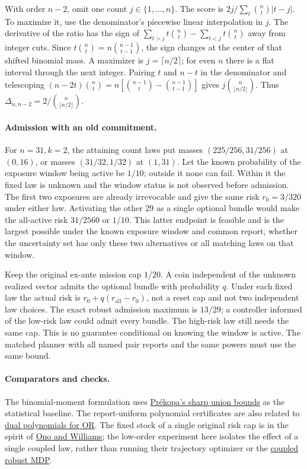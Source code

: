 \documentclass{article}
\begin{document}
With order \(n-2\), omit one count \(j\in\{1,\ldots,n\}\).
The score is \(2j/\sum_t\binom nt|t-j|\). To maximize it,
use the denominator's piecewise linear interpolation in \(j\).
The derivative of the ratio has the sign of
\(\sum_{t>j}t\binom nt-\sum_{t<j}t\binom nt\) away from
integer cuts. Since \(t\binom nt=n\binom{n-1}{t-1}\),
the sign changes at the center of that shifted binomial
mass. A maximizer is \(j=\lceil n/2\rceil\); for even \(n\)
there is a flat interval through the next integer. Pairing
\(t\) and \(n-t\) in the denominator and telescoping
\((n-2t)\binom nt=n[\binom{n-1}t-\binom{n-1}{t-1}]\)
gives \(j\binom n{\lfloor n/2\rfloor}\).
Thus \(\Delta_{n,n-2}=2/\binom n{\lfloor n/2\rfloor}\).

\paragraph{Admission with an old commitment.}
For \(n=31,k=2\), the attaining count laws put masses
\((225/256,31/256)\) at \((0,16)\), or masses
\((31/32,1/32)\) at \((1,31)\). Let the known probability of
the exposure window being active be \(1/10\); outside it none
can fail. Within it the fixed law is unknown and the window
status is not observed before admission. The first two
exposures are already irrevocable and give the same risk
\(r_0=3/320\) under either law. Activating the other 29 as a
single optional bundle would make the all-active risk
\(31/2560\) or \(1/10\). This latter endpoint is feasible
and is the largest possible under the known exposure window
and common report, whether the uncertainty set has only
these two alternatives or all matching laws on that window.

Keep the original ex-ante mission cap \(1/20\). A coin
independent of the unknown realized vector admits the optional
bundle with probability \(q\). Under each fixed law the actual
risk is \(r_0+q(r_{\mathrm{all}}-r_0)\), not a reset cap and
not two independent law choices. The exact robust admission
maximum is \(13/29\); a controller informed of the low-risk
law could admit every bundle. The high-risk law still needs
the same cap. This is no guarantee conditional on knowing
the window is active. The matched planner with all named
pair reports and the same powers must use the same bound.

\paragraph{Comparators and checks.}
The binomial-moment formulation uses
\href{https://doi.org/10.1287/opre.38.2.227}{Pr\'ekopa's
sharp union bounds} as the statistical baseline. The
report-uniform polynomial certificates are also related to
\href{https://arxiv.org/abs/0803.4516}{dual polynomials for OR}.
The fixed stock of a single original risk cap is in the spirit of
\href{https://groups.csail.mit.edu/mers/papers/Ono-Williams_AAMAS10.pdf}{Ono and Williams};
the low-order experiment here isolates the effect of a single
coupled law, rather than running their trajectory optimizer or the
\href{https://arxiv.org/abs/1811.00215}{coupled robust MDP}.
\end{document}
